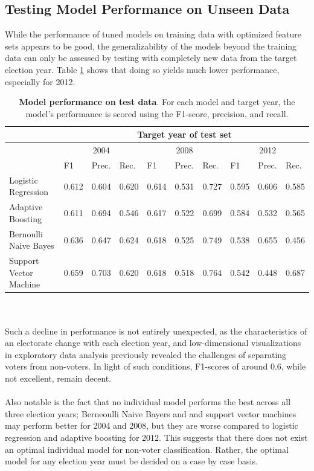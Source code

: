 \documentclass{article}
\begin{document}
	\subsection{Testing Model Performance on Unseen Data}

	While the performance of tuned models on training data with optimized feature sets appears to be good, the generalizability of the models beyond the training data can only be assessed by testing with completely new data from the target election year. Table \ref{table:tuning_testing_results} shows that doing so yields much lower performance, especially for 2012.
		\begin{table}[h]
		\begin{tabular}{|m{4cm}|m{0.9cm}|m{0.9cm}|m{0.9cm}|m{0.9cm}|m{0.9cm}|m{0.9cm}|m{0.9cm}|m{0.9cm}|m{0.9cm}|}
			\hline &
			\multicolumn{9}{|c|}{Target year of test set} \\
			\hline &
			\multicolumn{3}{|c|}{2004} &
			\multicolumn{3}{|c|}{2008} &
			\multicolumn{3}{|c|}{2012} \\
			\hline
			& F1 & Prec. & Rec. & F1 & Prec. & Rec. & F1 & Prec. & Rec. \\
			\hline
			Logistic Regression & 0.612 & 0.604 & 0.620 & 0.614 & 0.531 & 0.727 & 0.595 & 0.606 & 0.585
			\\ \hline
			Adaptive Boosting & 0.611 & 0.694 & 0.546 & 0.617 & 0.522 & 0.699 & 0.584 & 0.532 & 0.565
			\\ \hline
			Bernoulli Naive Bayes & 0.636 & 0.647 & 0.624 & 0.618 & 0.525 & 0.749 & 0.538 & 0.655 & 0.456
			\\ \hline
			Support Vector Machine & 0.659 & 0.703 & 0.620 & 0.618 & 0.518 & 0.764 & 0.542 & 0.448 & 0.687
			\\ \hline
		\end{tabular}
		\caption{\textbf{Model performance on test data}. For each model and target year, the model's performance is scored using the F1-score, precision, and recall.}
		\label{table:tuning_testing_results}
	\end{table}
	\hfill \\\\
	Such a decline in performance is not entirely unexpected, as the characteristics of an electorate change with each election year, and low-dimensional visualizations in exploratory data analysis previously revealed the challenges of separating voters from non-voters. In light of such conditions, F1-scores of around 0.6, while not excellent, remain decent.
	\\\\
	Also notable is the fact that no individual model performs the best across all three election years; Berneoulli Naive Bayers and and support vector machines may perform better for 2004 and 2008, but they are worse compared to logistic regression and adaptive boosting for 2012. This suggests that there does not exist an optimal individual model for non-voter classification. Rather, the optimal model for any election year must be decided on a case by case basis.
	
\end{document}
